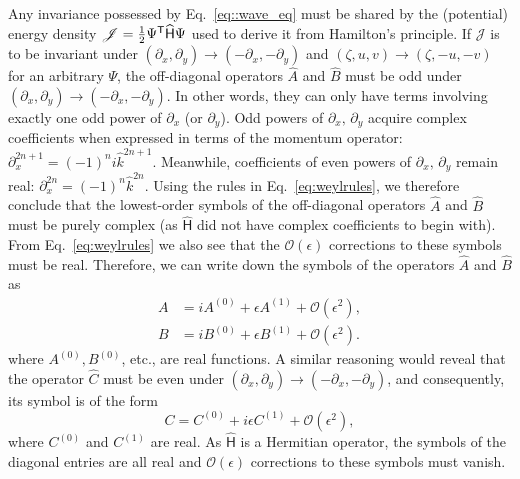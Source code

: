 Any invariance possessed by Eq.~\eqref{eq::wave_eq} must be shared by the (potential) energy density $\mathscr{J} = \frac{1}{2}\Psi^\mathsf{T}\widehat{\mathsf{H}}\Psi$ used to derive it from Hamilton's principle.
If $\mathscr{J}$ is to be invariant under $(\partial_{x}, \partial_{y}) \to (-\partial_{x}, -\partial_{y})$ and $(\zeta, u, v) \to (\zeta, -u, -v)$ for an arbitrary $\Psi$, the off-diagonal operators $\hat{A}$ and $\hat{B}$ must be odd under $(\partial_{x}, \partial_{y}) \to (-\partial_{x}, -\partial_{y})$.
In other words, they can only have terms involving exactly one odd power of $\partial_{x}$ (or $\partial_{y}$).
Odd powers of $\partial_{x},\, \partial_{y}$ acquire complex coefficients when expressed in terms of the momentum operator: $\partial_{x}^{2n+1} = (-1)^{n}i\hat{k}^{2n+1}$.
Meanwhile, coefficients of even powers of $\partial_{x},\, \partial_{y}$ remain real: $\partial_{x}^{2n} = (-1)^{n}\hat{k}^{2n}$.
Using the rules in Eq.~\eqref{eq:weylrules}, we therefore conclude that the lowest-order symbols of the off-diagonal operators  $\hat{A}$ and $\hat{B}$ must be purely complex (as $\widehat{\mathsf{H}}$ did not have complex coefficients to begin with).
From Eq.~\eqref{eq:weylrules} we also see that the $\mathcal{O}(\epsilon)$ corrections to these symbols must be real.
Therefore, we can write down the symbols of the operators $\hat{A}$ and $\hat{B}$ as
%
\begin{equation}
  \begin{aligned}
    A &= iA^{(0)} + \epsilon A^{(1)} + \mathcal{O}(\epsilon^{2}),\\
    B &= iB^{(0)} + \epsilon B^{(1)} + \mathcal{O}(\epsilon^{2}).
  \end{aligned}
\end{equation}
%
where $A^{(0)}, B^{(0)}$, etc., are real functions.
A similar reasoning would reveal that the operator $\hat{C}$ must be even under $(\partial_{x}, \partial_{y}) \to (-\partial_{x}, -\partial_{y})$, and consequently, its symbol is of the form
%
\begin{equation}
  C = C^{(0)} + i\epsilon C^{(1)} + \mathcal{O}(\epsilon^{2}),
\end{equation}
%
where $C^{(0)}$ and $C^{(1)}$ are real.
%
As $\widehat{\mathsf{H}}$ is a Hermitian operator, the symbols of the diagonal entries are all real and $\mathcal{O}(\epsilon)$ corrections to these symbols must vanish.

